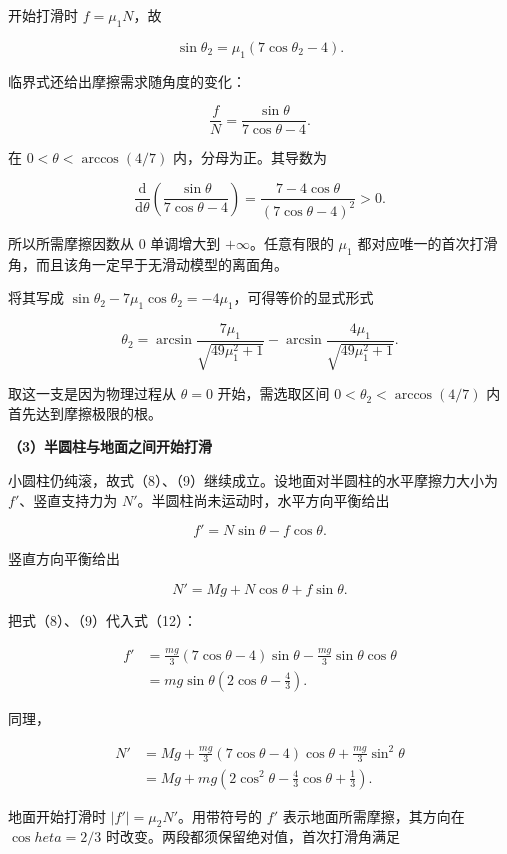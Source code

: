 \documentclass[12pt,a4paper,UTF8]{ctexart}
\begin{document}
开始打滑时 \(f=\mu_1N\)，故

\[\boxed{\sin\theta_2=\mu_1(7\cos\theta_2-4)}. \tag{10}\]

临界式还给出摩擦需求随角度的变化：

\[\frac{f}{N}
=\frac{\sin\theta}{7\cos\theta-4}.\]

在 \(0<\theta<\arccos(4/7)\) 内，分母为正。其导数为

\[\frac{\mathrm d}{\mathrm d\theta}
\left(\frac{\sin\theta}{7\cos\theta-4}\right)
=\frac{7-4\cos\theta}{(7\cos\theta-4)^2}>0.\]

所以所需摩擦因数从 \(0\) 单调增大到 \(+\infty\)。任意有限的 \(\mu_1\)
都对应唯一的首次打滑角，而且该角一定早于无滑动模型的离面角。

将其写成 \(\sin\theta_2-7\mu_1\cos\theta_2=-4\mu_1\)，可得等价的显式形式

\[\boxed{
\theta_2=\arcsin\frac{7\mu_1}{\sqrt{49\mu_1^2+1}}
-\arcsin\frac{4\mu_1}{\sqrt{49\mu_1^2+1}}
}. \tag{11}\]

取这一支是因为物理过程从 \(\theta=0\) 开始，需选取区间
\(0<\theta_2<\arccos(4/7)\) 内首先达到摩擦极限的根。

\textbf{（3）半圆柱与地面之间开始打滑}

小圆柱仍纯滚，故式（8）、（9）继续成立。设地面对半圆柱的水平摩擦力大小为
\(f'\)、竖直支持力为 \(N'\)。半圆柱尚未运动时，水平方向平衡给出

\[f'=N\sin\theta-f\cos\theta. \tag{12}\]

竖直方向平衡给出

\[N'=Mg+N\cos\theta+f\sin\theta. \tag{13}\]

把式（8）、（9）代入式（12）：

\[\begin{aligned}
f'
&=\frac{mg}{3}(7\cos\theta-4)\sin\theta
-\frac{mg}{3}\sin\theta\cos\theta\\
&=mg\sin\theta\left(2\cos\theta-\frac43\right).
\end{aligned} \tag{14}\]

同理，

\[\begin{aligned}
N'
&=Mg+\frac{mg}{3}(7\cos\theta-4)\cos\theta
+\frac{mg}{3}\sin^2\theta\\
&=Mg+mg\left(2\cos^2\theta-\frac43\cos\theta+\frac13\right).
\end{aligned} \tag{15}\]

地面开始打滑时 \(|f'|=\mu_2N'\)。用带符号的 \(f'\)
表示地面所需摩擦，其方向在 \(\cos   heta=2/3\)
时改变。两段都须保留绝对值，首次打滑角满足
\end{document}
